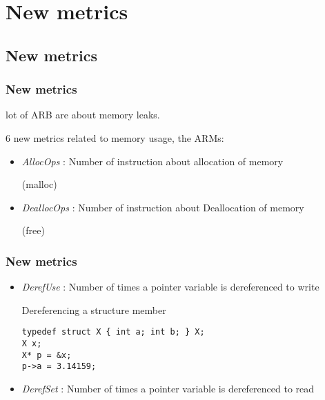 \section{New metrics}

\subsection{New metrics}
\begin{frame}
 \frametitle{New metrics}
 \begin{center}
  \alert{lot of ARB are about memory leaks.}
 \end{center}
 6 new metrics related to memory usage, the \alert{ARMs}:
 \vfill
 \begin{itemize}
  \item \emph{AllocOps} : Number of instruction about allocation of memory
   \begin{center}
    (malloc)
   \end{center}
  \item \emph{DeallocOps} : Number of instruction about Deallocation of memory
   \begin{center}
    (free)
   \end{center}
 \end{itemize}
\end{frame}

\begin{frame}[fragile]
 \frametitle{New metrics}
 \begin{itemize}
  \item \emph{DerefUse} : Number of times a pointer variable is dereferenced to write
   \begin{exampleblock}{Dereferencing a structure member}
    \begin{verbatim}typedef struct X { int a; int b; } X;
X x;
X* p = &x;
p->a = 3.14159;\end{verbatim}
   \end{exampleblock}
  \item \emph{DerefSet} : Number of times a pointer variable is dereferenced to read
 \end{itemize}
\end{frame}

